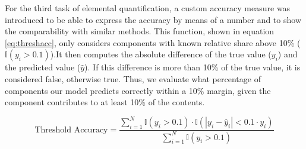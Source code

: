 For the third task of elemental quantification, a custom accuracy measure was introduced to be able to express the accuracy by means of a number and to show the comparability with similar methods. This function, shown in equation \ref{eq:threshacc}, only considers components with known relative share above 10\% ($\mathbb{I}(y_i > 0.1)$).It then computes the absolute difference of the true value ($y_{i}$) and the predicted value ($\hat{y}$). If this difference is more than 10\% of the true value, it is considered false, otherwise true. Thus, we evaluate what percentage of components our model predicts correctly within a 10\% margin, given the component contributes to at least 10\% of the contents.

\begin{equation}
\label{eq:threshacc}
\text{Threshold Accuracy} = \frac{\sum_{i=1}^{N} \mathbb{I}(y_i > 0.1) \cdot \mathbb{I}(|y_i - \hat{y}_i| < 0.1 \cdot y_i)}{\sum_{i=1}^{N} \mathbb{I}(y_i > 0.1)}
\end{equation}



